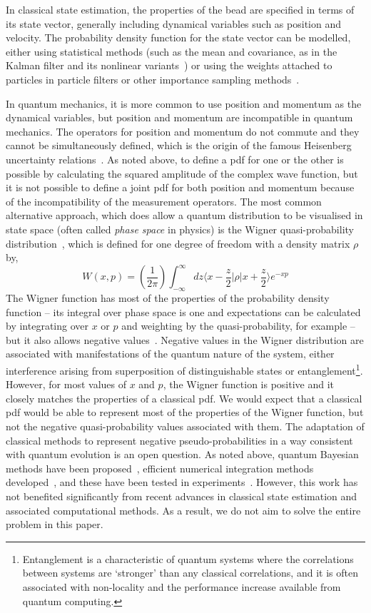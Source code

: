 \documentclass[conference]{IEEEtran}
\begin{document}
In classical state estimation, the properties of the bead are specified in terms of its state vector, generally including dynamical variables such as position and velocity. The probability density function for the state vector can be modelled, either using statistical methods (such as the mean and covariance, as in the Kalman filter and its nonlinear variants~\cite{Aru2002}) or using the weights attached to particles in particle filters or other importance sampling methods~\cite{Gor1993,Dou2001,Aru2002}. 

In quantum mechanics, it is more common to use position and momentum as the dynamical variables, but position and momentum are incompatible  in quantum mechanics. The operators for position and momentum do not commute and they cannot be simultaneously defined, which is the origin of the famous Heisenberg uncertainty relations~\cite{Wis2010,Jac2014}. As noted above, to define a pdf for one or the other is possible by calculating the squared amplitude of the complex wave function, but it is not possible to define a joint pdf for both position and momentum because of the incompatibility of the measurement operators. The most common alternative approach, which does allow a quantum distribution to be visualised in state space (often called {\it phase space} in physics) is the Wigner quasi-probability distribution~\cite{Til2016}, which is defined for one degree of freedom with a density matrix $\rho$ by,
\begin{equation}
W(x,p) = \left(\frac{1}{2\pi}\right)\int_{-\infty}^{\infty}dz\langle x-\frac{z}{2}\left|\rho\right|x+\frac{z}{2}\rangle e^{-xp}
\end{equation}
The Wigner function has most of the properties of the probability density function -- its integral over phase space is one and expectations can be calculated by integrating over $x$ or $p$ and weighting by the quasi-probability, for example -- but it also allows negative values~\cite{Sze2005}. Negative values in the Wigner distribution are associated with manifestations of the quantum nature of the system, either interference arising from superposition of distinguishable states or entanglement\footnote{Entanglement is a characteristic of quantum systems where the correlations between systems are `stronger' than any classical correlations, and it is often associated with non-locality and the performance increase available from quantum computing.}. However, for most values of $x$ and $p$, the Wigner function is positive and it closely matches the properties of a classical pdf. We would expect that a classical pdf would be able to represent most of the properties of the Wigner function, but not the negative quasi-probability values associated with them. The adaptation of classical methods to represent negative pseudo-probabilities in a way consistent with quantum evolution is an open question. As noted above, quantum Bayesian methods have been proposed~\cite{Kor99}, efficient numerical integration methods developed~\cite{Ami2011,Rou2015}, and these have been tested in experiments~\cite{Mur2013,Web2014,Six2015}. However, this work has not benefited significantly from recent advances in classical state estimation and associated computational methods. As a result, we do not aim to solve the entire problem in this paper. 
\end{document}
